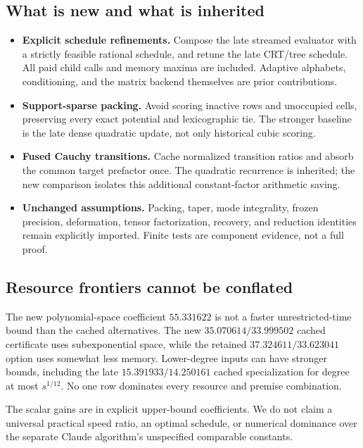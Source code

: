 \documentclass[11pt,letterpaper]{article}
\theoremstyle{remark}\newtheorem{remark}[theorem]{Remark}
\begin{document}
\subsection{What is new and what is inherited}
\begin{itemize}
\item \textbf{Explicit schedule refinements.} Compose the late streamed evaluator
with a strictly feasible rational schedule, and retune the late CRT/tree schedule.
All paid child calls and memory maxima are included. Adaptive alphabets,
conditioning, and the matrix backend themselves are prior contributions.
\item \textbf{Support-sparse packing.} Avoid scoring inactive rows and unoccupied
cells, preserving every exact potential and lexicographic tie. The stronger
baseline is the late dense quadratic update, not only historical cubic scoring.
\item \textbf{Fused Cauchy transitions.} Cache normalized transition ratios and
absorb the common target prefactor once. The quadratic recurrence is inherited;
the new comparison isolates this additional constant-factor arithmetic saving.
\item \textbf{Unchanged assumptions.} Packing, taper, mode integrality, frozen
precision, deformation, tensor factorization, recovery, and reduction identities
remain explicitly imported. Finite tests are component evidence, not a full proof.
\end{itemize}

\subsection{Resource frontiers cannot be conflated}
The new polynomial-space coefficient $55.331622$ is not a faster unrestricted-time
bound than the cached alternatives. The new $35.070614/33.999502$ cached
certificate uses subexponential space, while the retained $37.324611/33.623041$
option uses somewhat less memory. Lower-degree inputs can have stronger bounds,
including the late $15.391933/14.250161$ cached specialization for degree at most
$s^{1/12}$. No one row dominates every resource and premise combination.

The scalar gains are in explicit upper-bound coefficients. We do not claim a
universal practical speed ratio, an optimal schedule, or numerical dominance over
the separate Claude algorithm's unspecified comparable constants.
\end{document}

